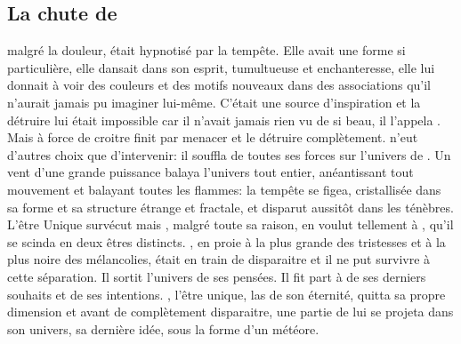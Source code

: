    
  \subsection{La chute de \Mey}
  
  \Mey malgré la douleur, était hypnotisé par la tempête. Elle avait une forme si particulière, elle dansait dans son esprit, tumultueuse et enchanteresse, elle lui donnait à voir des couleurs et des motifs nouveaux dans des associations qu'il n'aurait jamais pu imaginer lui-même. C'était une source d'inspiration et la détruire lui était impossible car il n'avait jamais rien vu de si beau, il l'appela \auga. Mais \auga à force de croitre finit par menacer \Mey et le détruire complètement. \Cind n'eut d'autres choix que d'intervenir: il souffla de toutes ses forces sur l'univers de \Mey. Un vent d'une grande puissance balaya l'univers tout entier, anéantissant tout mouvement et balayant toutes les flammes: la tempête se figea, cristallisée dans sa forme et sa structure étrange et fractale, et disparut aussitôt dans les ténèbres. L'être Unique survécut mais \Mey, malgré toute sa raison, en voulut tellement à \Cind, qu'il se scinda en deux êtres distincts. \Mey, en proie à la plus grande des tristesses et à la plus noire des mélancolies, était en train de disparaitre et il ne put survivre  à cette séparation. Il sortit l'univers de ses pensées. Il fit part à \Cind de ses derniers souhaits et de ses intentions. \Mey, l'être unique, las de son éternité, quitta sa propre dimension et avant de complètement disparaitre, une partie de lui se projeta dans son univers, sa dernière idée, sous la forme d'un météore.
  
  
  
  